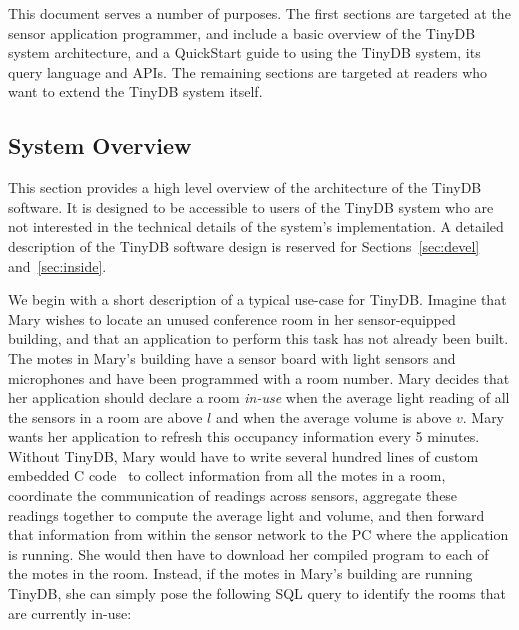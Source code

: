 \documentclass[11pt]{article}
\begin{document}
This document serves a number of purposes.  The first sections are
targeted at the sensor application programmer, and include a basic
overview of the TinyDB system architecture, and a QuickStart guide to
using the TinyDB system, its query language and APIs.  The remaining
sections are targeted at readers who want to extend the TinyDB system
itself.

\subsection{System Overview}

This section provides a high level overview of the architecture of the TinyDB software.  It
is designed to be accessible to users of the TinyDB system who are not interested in
the technical details of the system's implementation.  A detailed
description of the TinyDB software design
is reserved for Sections~\ref{sec:devel} and~\ref{sec:inside}.  

We begin with a short description of a typical use-case for TinyDB.  Imagine that Mary
wishes to locate an unused conference room in her sensor-equipped building, and
that an application to perform this task has not already been built.
The motes in Mary's
building have a sensor board with light sensors and microphones and have been programmed with
a room number.  Mary decides that her application
should declare a room {\it in-use} when the average light reading of all the sensors in a room
are above $l$ and when the average volume is above $v$.  Mary wants her application to 
refresh this occupancy information every 5 minutes.  Without TinyDB, Mary
would have to write several hundred lines of custom embedded C
code~ to collect information
from all the motes in a room, coordinate the communication of readings
across sensors,
aggregate these readings together to compute the average light
and volume, and then forward that information from within the sensor network to the PC where
the application is running.  She would then have to download her compiled
program to each of the motes in the room.  Instead, if the motes in Mary's building are running TinyDB,
she can simply pose the following SQL
query to identify the rooms that are currently in-use:
\end{document}
